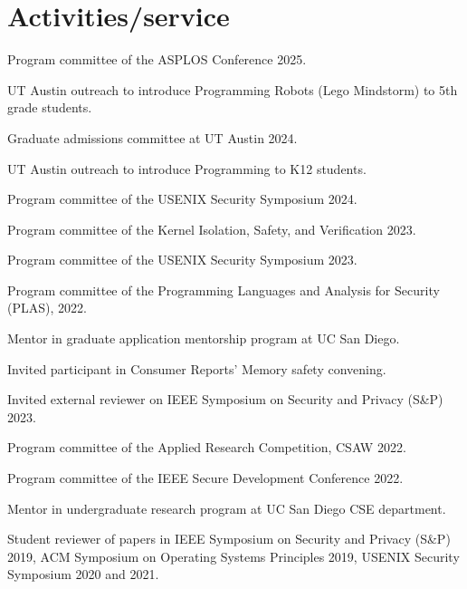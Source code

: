 \section{Activities/service}

{ Program committee of the ASPLOS Conference 2025. }

{ UT Austin
outreach to introduce Programming Robots (Lego Mindstorm) to 5th grade students.
}

{ Graduate admissions committee at UT Austin 2024. }

{ UT Austin
outreach to introduce Programming to K12 students. }

{ Program committee of the USENIX Security Symposium 2024. }

{ Program committee of the Kernel Isolation, Safety, and Verification 2023. }

{ Program committee of the USENIX Security Symposium 2023. }

{ Program committee of the Programming Languages and Analysis for Security (PLAS), 2022. }

{ Mentor in 
graduate application mentorship program at UC San Diego. }

{ Invited participant in Consumer Reports' Memory safety convening. }

{ Invited external reviewer on IEEE Symposium on Security and Privacy (S\&P) 2023.}

{ Program committee of the Applied Research Competition, CSAW 2022. }

{ Program committee of the IEEE Secure Development Conference 2022. }

{ Mentor in  undergraduate research program at UC San Diego CSE department. }

{ Student reviewer of papers in IEEE Symposium on Security and Privacy (S\&P)
2019, ACM Symposium on Operating Systems Principles 2019, USENIX Security
Symposium 2020 and 2021. }
